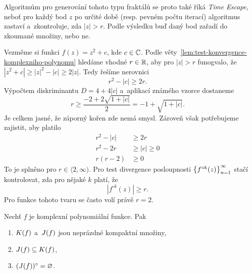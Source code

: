 Algoritmům pro generování tohoto typu fraktálů se proto také říká \emph{Time Escape}, neboť pro každý bod $z$ po určité době (resp. pevném počtu iterací) algoritmus zastaví a~zkontroluje, zda $|z|>r$. Podle výsledku buď daný bod zařadí do zkoumané množiny, nebo ne.
\begin{example}
    Vezměme si funkci $f(z)=z^2+c$, kde $c\in\mathbb{C}$. Podle věty~\ref{lem:test-konvergence-komplexniho-polynomu} hledáme vhodné $r\in\mathbb{R}$, aby pro $|z|>r$ funogvalo, že $|z^2+c|\geqslant|z|^2-|c|\geqslant 2|z|$. Tedy řešíme nerovnici
    \[r^2-|c|\geqslant 2r.\]
    Výpočtem diskriminantu $D=4+4|c|$ a~aplikací známého vzorce dostaneme
    \[r\geqslant\frac{-2+2\sqrt{1+|c|}}{2}=-1+\sqrt{1+|c|}.\]
    Je celkem jasné, že záporný kořen zde nemá smysl. Zároveň však potřebujeme zajistit, aby platilo
    \begin{align*}
        r^2-|c|&\geqslant 2r\\
        r^2-2r&\geqslant|c|\geqslant 0\\
        r(r-2)&\geqslant 0
    \end{align*}
    To je splněno pro $r\in\langle 2,\infty)$. Pro test divergence posloupnosti $\left\{f^{\circ k}(z)\right\}_{n=1}^\infty$ stačí kontrolovat, zda pro nějaké $k$ platí, že
    \[|f^{\circ k}(z)|\geqslant r.\]
    Pro funkce tohoto tvaru se často volí právě $r=2$.
\end{example}
\begin{theorem}\label{thm:vztah-kf-a-jf}
    Nechť $f$ je komplexní polynomiální funkce. Pak
    \begin{enumerate}[label=(\roman*)]
        \item\label{thm:kompaktnost-kf-jf} $K(f)$ a~$J(f)$ jsou neprázdné kompaktní množiny,
        \item\label{thm:jf-podmnozina-kf} $J(f)\subseteq K(f)$,
        \item\label{thm:vnitrek-jf-neprazdny} $(J(f))^\circ=\varnothing$.
    \end{enumerate}
\end{theorem}
